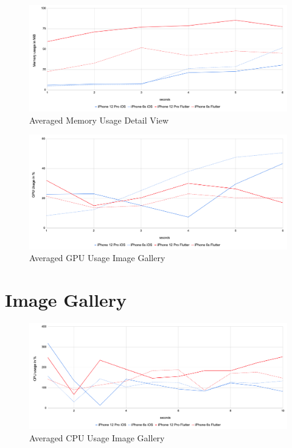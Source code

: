 \begin{figure}[!htbp]
    \centering
    \includegraphics[width=\linewidth]{images/performance_results/detail_view/avg_memory_usage_detail_view.png}
    \caption{Averaged Memory Usage Detail View}
    \label{fig:avg_memory_usage_detail_view}
\end{figure}

\begin{figure}[!htbp]
    \centering
    \includegraphics[width=\linewidth]{images/performance_results/detail_view/avg_gpu_usage_detail_view.png}
    \caption{Averaged GPU Usage Image Gallery}
    \label{fig:avg_gpu_usage_image_gallery}
\end{figure}
\FloatBarrier


\section{Image Gallery}
\begin{figure}[!htbp]
    \centering
    \includegraphics[width=\linewidth]{images/performance_results/image_gallery/avg_cpu_usage_image_gallery.png}
    \caption{Averaged CPU Usage Image Gallery}
    \label{fig:avg_cpu_usage_image_gallery}
\end{figure}

